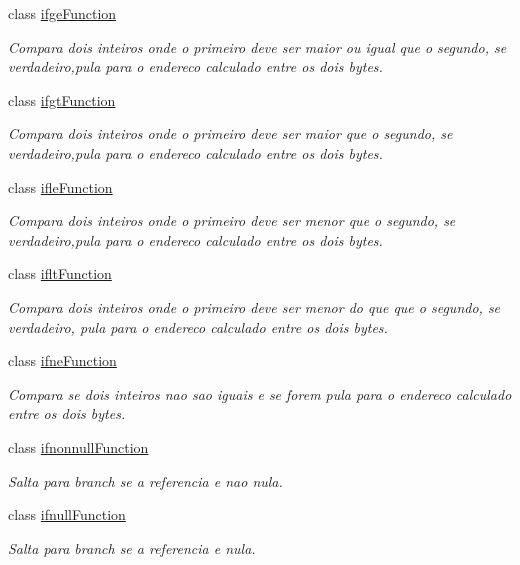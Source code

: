 \begin{DoxyCompactItemize}
class \hyperlink{classInstruction_1_1ifgeFunction}{ifge\+Function}
\begin{DoxyCompactList}\small\item\em Compara dois inteiros onde o primeiro deve ser maior ou igual que o segundo, se verdadeiro,pula para o endereco calculado entre os dois bytes. \end{DoxyCompactList}\item 
class \hyperlink{classInstruction_1_1ifgtFunction}{ifgt\+Function}
\begin{DoxyCompactList}\small\item\em Compara dois inteiros onde o primeiro deve ser maior que o segundo, se verdadeiro,pula para o endereco calculado entre os dois bytes. \end{DoxyCompactList}\item 
class \hyperlink{classInstruction_1_1ifleFunction}{ifle\+Function}
\begin{DoxyCompactList}\small\item\em Compara dois inteiros onde o primeiro deve ser menor que o segundo, se verdadeiro,pula para o endereco calculado entre os dois bytes. \end{DoxyCompactList}\item 
class \hyperlink{classInstruction_1_1ifltFunction}{iflt\+Function}
\begin{DoxyCompactList}\small\item\em Compara dois inteiros onde o primeiro deve ser menor do que que o segundo, se verdadeiro, pula para o endereco calculado entre os dois bytes. \end{DoxyCompactList}\item 
class \hyperlink{classInstruction_1_1ifneFunction}{ifne\+Function}
\begin{DoxyCompactList}\small\item\em Compara se dois inteiros nao sao iguais e se forem pula para o endereco calculado entre os dois bytes. \end{DoxyCompactList}\item 
class \hyperlink{classInstruction_1_1ifnonnullFunction}{ifnonnull\+Function}
\begin{DoxyCompactList}\small\item\em Salta para branch se a referencia e nao nula. \end{DoxyCompactList}\item 
class \hyperlink{classInstruction_1_1ifnullFunction}{ifnull\+Function}
\begin{DoxyCompactList}\small\item\em Salta para branch se a referencia e nula. \end{DoxyCompactList}\item 

\end{DoxyCompactItemize}
